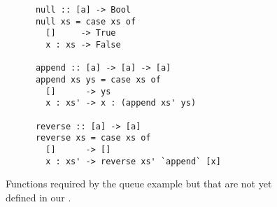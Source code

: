\begin{figure}[H]
  \begin{minipage}{0.40\linewidth}
    \begin{verbatim}
      null :: [a] -> Bool
      null xs = case xs of
        []     -> True
        x : xs -> False

      append :: [a] -> [a] -> [a]
      append xs ys = case xs of
        []      -> ys
        x : xs' -> x : (append xs' ys)

      reverse :: [a] -> [a]
      reverse xs = case xs of
        []      -> []
        x : xs' -> reverse xs' `append` [x]
    \end{verbatim}
  \end{minipage}
  \caption{
    Functions required by the queue example but that are not yet defined in our .
  }
  \label{fig:case-study:aux}
\end{figure}

